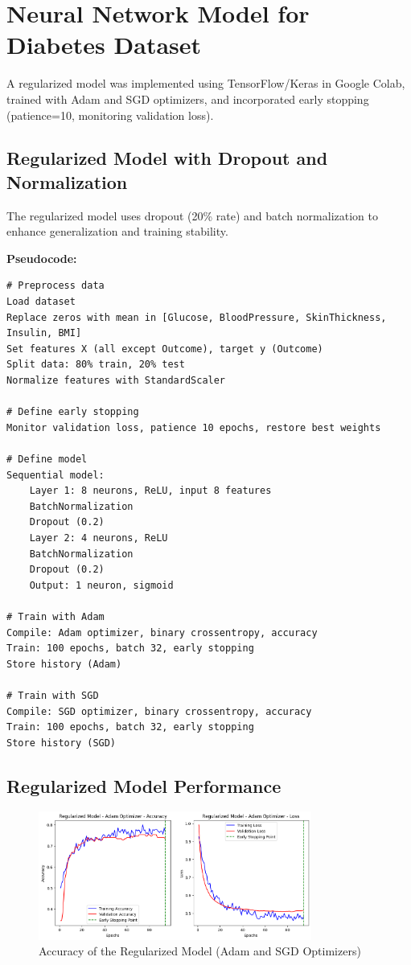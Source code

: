 \documentclass[a4paper,12pt]{article}
\begin{document}
\clearpage %

\section*{Neural Network Model for Diabetes Dataset}
A regularized model was implemented using TensorFlow/Keras in Google Colab, trained with Adam and SGD optimizers, and incorporated early stopping (patience=10, monitoring validation loss).

\subsection*{Regularized Model with Dropout and Normalization}
The regularized model uses dropout (20\% rate) and batch normalization to enhance generalization and training stability.

\textbf{Pseudocode:}
\begin{lstlisting}
# Preprocess data
Load dataset
Replace zeros with mean in [Glucose, BloodPressure, SkinThickness, Insulin, BMI]
Set features X (all except Outcome), target y (Outcome)
Split data: 80% train, 20% test
Normalize features with StandardScaler

# Define early stopping
Monitor validation loss, patience 10 epochs, restore best weights

# Define model
Sequential model:
    Layer 1: 8 neurons, ReLU, input 8 features
    BatchNormalization
    Dropout (0.2)
    Layer 2: 4 neurons, ReLU
    BatchNormalization
    Dropout (0.2)
    Output: 1 neuron, sigmoid

# Train with Adam
Compile: Adam optimizer, binary crossentropy, accuracy
Train: 100 epochs, batch 32, early stopping
Store history (Adam)

# Train with SGD
Compile: SGD optimizer, binary crossentropy, accuracy
Train: 100 epochs, batch 32, early stopping
Store history (SGD)
\end{lstlisting}

\subsection*{Regularized Model Performance}
\begin{figure}[H]
    \centering
    \includegraphics[width=0.8\textwidth]{assets/diabetes/adam_diabetes_loss.png}
    \caption{Accuracy of the Regularized Model (Adam and SGD Optimizers)}
\end{figure}
\end{document}
